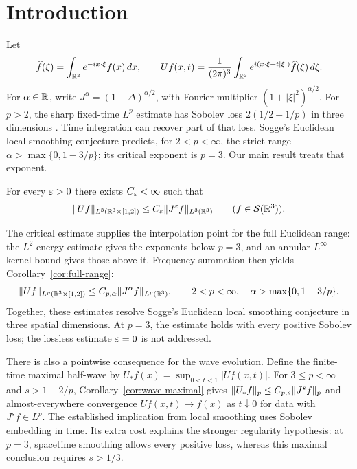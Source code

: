 \begin{abstract}
We prove the critical $L^3$ local smoothing estimate for the wave equation
in three spatial dimensions, with every positive Sobolev loss. This resolves
Sogge's Euclidean local smoothing conjecture in dimension three.
\end{abstract}

\section{Introduction}\label{sec:introduction}

Let
\[
 \widehat f(\xi)=\int_{\mathbb R^3}e^{-ix\cdot\xi}f(x)\,dx,
 \qquad
 Uf(x,t)=\frac1{(2\pi)^3}
       \int_{\mathbb R^3}e^{i(x\cdot\xi+t|\xi|)}\widehat f(\xi)\,d\xi.
\]
For $\alpha\in\mathbb R$, write $J^\alpha=(1-\Delta)^{\alpha/2}$, with
Fourier multiplier $(1+|\xi|^2)^{\alpha/2}$.
For $p>2$, the sharp fixed-time $L^p$ estimate has Sobolev loss
$2(1/2-1/p)$ in three dimensions \cite{Peral1980,Miyachi1980}.
Time integration can recover part of that loss. Sogge's Euclidean
local smoothing conjecture \cite{Sogge1991} predicts, for $2<p<\infty$,
the strict range $\alpha>\max\{0,1-3/p\}$; its critical exponent is
$p=3$. Our main result treats that exponent.

\begin{theorem}\label{thm:main}
For every $\varepsilon>0$ there exists $C_\varepsilon<\infty$ such that
\begin{equation}\label{eq:intro-main}
 \lVert Uf\rVert_{L^3(\mathbb R^3\times[1,2])}
 \le C_\varepsilon\lVert J^\varepsilon f\rVert_{L^3(\mathbb R^3)}
 \qquad (f\in\mathcal S(\mathbb R^3)).
\end{equation}
\end{theorem}

The critical estimate supplies the interpolation point for the full
Euclidean range: the $L^2$ energy estimate gives the exponents below
$p=3$, and an annular $L^\infty$ kernel bound gives those above it.
Frequency summation then yields Corollary~\ref{cor:full-range}:
\begin{equation}\label{eq:intro-full}
 \lVert Uf\rVert_{L^p(\mathbb R^3\times[1,2])}
 \le C_{p,\alpha}\lVert J^\alpha f\rVert_{L^p(\mathbb R^3)},
 \qquad
 2<p<\infty,\quad \alpha>\max\{0,1-3/p\}.
\end{equation}
Together, these estimates resolve Sogge's Euclidean local smoothing
conjecture in three spatial dimensions. At $p=3$, the estimate holds with
every positive Sobolev loss; the lossless estimate $\varepsilon=0$ is not addressed.

There is also a pointwise consequence for the wave evolution. Define the
finite-time maximal half-wave by
$U_*f(x)=\sup_{0<t<1}|Uf(x,t)|$. For $3\le p<\infty$ and
$s>1-2/p$, Corollary~\ref{cor:wave-maximal} gives
$\lVert U_*f\rVert_p\le C_{p,s}\lVert J^s f\rVert_p$ and almost-everywhere
convergence $Uf(x,t)\to f(x)$ as $t\downarrow0$ for data with
$J^s f\in L^p$. The established implication from local smoothing uses
Sobolev embedding in time. Its extra cost explains the stronger
regularity hypothesis: at $p=3$, spacetime smoothing allows every
positive loss, whereas this maximal conclusion requires $s>1/3$.

